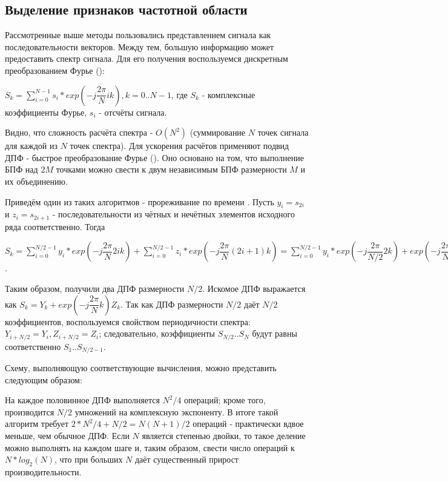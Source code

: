 \subsection{Выделение признаков частотной области}

Рассмотренные выше методы пользовались представлением сигнала как последовательности векторов. Между тем, большую информацию может предоставить спектр сигнала. Для его получения воспользуемся дискретным преобразованием Фурье ()\cite{fft_alg}:

$S_k=\sum\limits_{i=0}^{N-1}s_i*exp(-j\dfrac{2\pi}{N}ik), k=0..N-1$, где $S_k$ - комплексные коэффициенты Фурье, $s_i$ - отсчёты сигнала.

Видно, что сложность расчёта спектра - $O(N^2)$ (суммирование $N$ точек сигнала для каждой из $N$ точек спектра). Для ускорения расчётов применяют подвид ДПФ - быстрое преобразование Фурье (). Оно основано на том, что выполнение БПФ над $2M$ точками можно свести к двум независимым БПФ размерности $M$ и их объединению. 

Приведём один из таких алгоритмов - прореживание по времени \cite{fft_alg}. Пусть $y_i=s_{2i}$ и $z_i=s_{2i+1}$ - последовательности из чётных и нечётных элементов исходного ряда соответственно. Тогда

$S_k=\sum\limits_{i=0}^{N/2-1}y_i*exp(-j\dfrac{2\pi}{N}2ik)+\sum\limits_{i=0}^{N/2-1}z_i*exp(-j\dfrac{2\pi}{N}(2i+1)k)=\sum\limits_{i=0}^{N/2-1}y_i*exp(-j\dfrac{2\pi}{N/2}2k)+exp(-j\dfrac{2\pi}{N}k)\sum\limits_{i=0}^{N/2-1}z_i*exp(-j\dfrac{2\pi}{N/2}ik)$.

Таким образом, получили два ДПФ размерности $N/2$. Искомое ДПФ выражается как 
$S_k=Y_k+exp(-j\dfrac{2\pi}{N}k)Z_k$. Так как ДПФ размерности $N/2$ даёт $N/2$ коэффициентов, воспользуемся свойством периодичности спектра: $Y_{i+N/2}=Y_i, Z_{i+N/2}=Z_i$; следовательно, коэффициенты $S_{N/2}..S_{N}$ будут равны соответственно $S_{1}..S_{N/2-1}$. 

Схему, выполняющую соответствующие вычисления, можно представить следующим образом:


На каждое половинное ДПФ выполняется $N^2/4$ операций; кроме того, производится $N/2$ умножений на комплексную экспоненту. В итоге такой алгоритм требует $2*N^2/4+N/2=N(N+1)/2$ операций - практически вдвое меньше, чем обычное ДПФ. Если $N$ является степенью двойки, то такое деление можно выполнять на каждом шаге и, таким образом, свести число операций к $N*log_2(N)$, что при больших $N$ даёт существенный прирост производительности.

